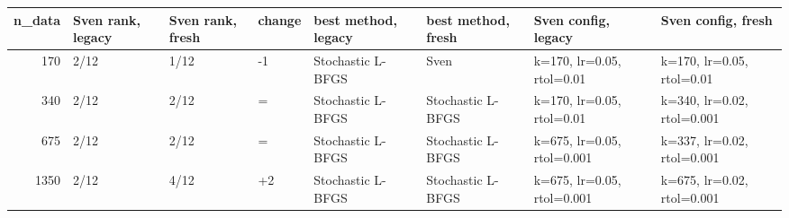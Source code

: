 \begin{tabular}{rlllllll}
\toprule
n\_data & Sven rank, legacy & Sven rank, fresh & change & best method, legacy & best method, fresh & Sven config, legacy & Sven config, fresh \\
\midrule
170 & 2/12 & 1/12 & -1 & Stochastic L-BFGS & Sven & k=170, lr=0.05, rtol=0.01 & k=170, lr=0.05, rtol=0.01 \\
340 & 2/12 & 2/12 & = & Stochastic L-BFGS & Stochastic L-BFGS & k=170, lr=0.05, rtol=0.01 & k=340, lr=0.02, rtol=0.001 \\
675 & 2/12 & 2/12 & = & Stochastic L-BFGS & Stochastic L-BFGS & k=675, lr=0.05, rtol=0.001 & k=337, lr=0.02, rtol=0.001 \\
1350 & 2/12 & 4/12 & +2 & Stochastic L-BFGS & Stochastic L-BFGS & k=675, lr=0.05, rtol=0.001 & k=675, lr=0.02, rtol=0.001 \\
\bottomrule
\end{tabular}
